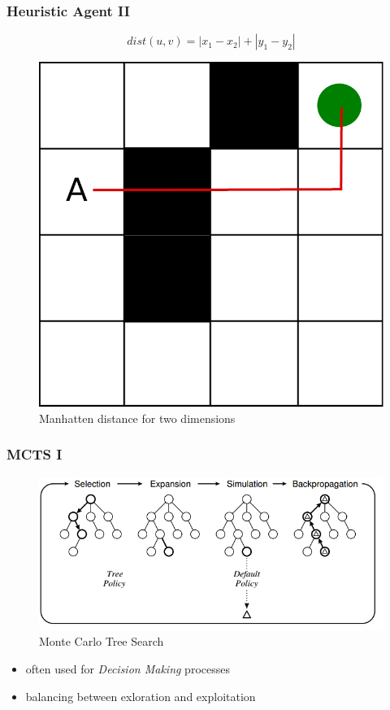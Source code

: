 \documentclass{beamer}
\begin{document}
\begin{frame}
\frametitle{Heuristic Agent II}
\begin{equation}
dist(u,v) = |x_{1} - x_{2}| + |y_{1} - y_{2}|
\end{equation}
\begin{figure}
\centering
\includegraphics[scale=0.3]{../report/images/manhatten.pdf}
\caption{Manhatten distance for two dimensions}
\label{fig:manhatten}
\end{figure}
\end{frame}





\begin{frame}
\frametitle{MCTS I}

\begin{figure}
\includegraphics[scale=0.35]{img/mcts_structure.png}
\caption{Monte Carlo Tree Search}
\label{fig:mcts_struc}
\end{figure}

\begin{itemize}
 \item often used for \textit{Decision Making} processes
 \item balancing between exloration and exploitation
\end{itemize}

\end{frame}
\end{document}
